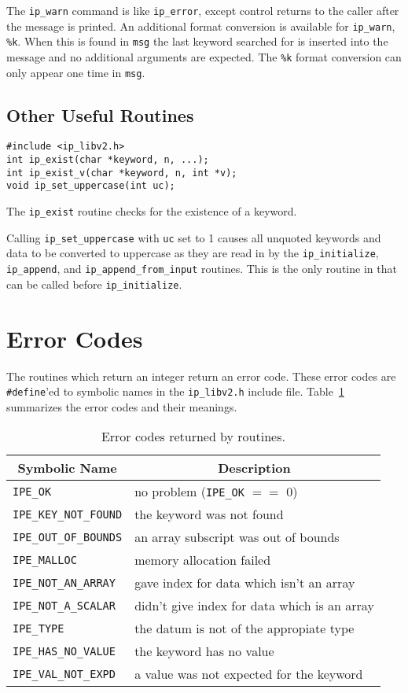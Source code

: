 The \verb|ip_warn| command is like \verb|ip_error|, except control returns
to the caller after the message is printed.  An additional format conversion
is available for \verb|ip_warn|, \verb|%k|.  When this is found in \verb|msg|
the last keyword searched for is inserted into the message and no additional
arguments are expected.  The \verb|%k| format conversion can only appear one
time in \verb|msg|.

\subsection{Other Useful Routines}
\begin{verbatim}
#include <ip_libv2.h>
int ip_exist(char *keyword, n, ...);
int ip_exist_v(char *keyword, n, int *v);
void ip_set_uppercase(int uc);
\end{verbatim} 
The \verb|ip_exist| routine checks for the existence of a keyword.

Calling \verb|ip_set_uppercase| with \verb|uc| set to 1 causes all
unquoted keywords and data to be converted to uppercase as they
are read in by the \verb|ip_initialize|, \verb|ip_append|, and
\verb|ip_append_from_input| routines.  This is the only routine
in \libip{} that can be called before \verb|ip_initialize|.


\section{Error Codes}
\label{errorsection}
The \libip{} routines which return an integer return an error code.
These error codes are \verb|#define|'ed to symbolic names in the
\verb|ip_libv2.h| include file. Table~\ref{errorcodes} summarizes
the error codes and their meanings.


\begin{table}[e]
\centering
\begin{tabular}{|l|l|}
\hline
\multicolumn{1}{|c}{Symbolic Name}
  & \multicolumn{1}{c|}{Description} \\
\hline
\verb|IPE_OK|                & no problem (\verb|IPE_OK| $==$ 0)\\
\verb|IPE_KEY_NOT_FOUND|     & the keyword was not found \\
\verb|IPE_OUT_OF_BOUNDS|     & an array subscript was out of bounds \\
\verb|IPE_MALLOC|            & memory allocation failed \\
\verb|IPE_NOT_AN_ARRAY|      & gave index for data which isn't an array \\
\verb|IPE_NOT_A_SCALAR|      & didn't give index for data which is an array \\
\verb|IPE_TYPE|              & the datum is not of the appropiate type \\
\verb|IPE_HAS_NO_VALUE|      & the keyword has no value \\
\verb|IPE_VAL_NOT_EXPD|      & a value was not expected for the keyword \\
\hline
\end{tabular}
\caption{Error codes returned by \libip{} routines.}
\label{errorcodes}
\end{table}

